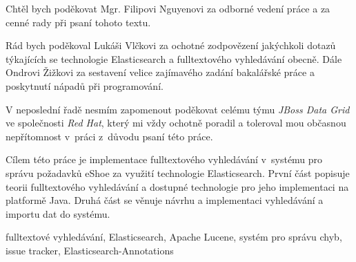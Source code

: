 \documentclass[11pt,oneside]{fithesis2}
\begin{document}
\FrontMatter
\ThesisTitlePage

\begin{ThesisDeclaration}
  \DeclarationText
  \AdvisorName
\end{ThesisDeclaration}

\begin{ThesisThanks}
Chtěl bych poděkovat Mgr. Filipovi Nguyenovi za odborné vedení práce a za cenné rady při psaní tohoto textu. 

Rád bych poděkoval Lukáši Vlčkovi za ochotné zodpovězení jakýchkoli dotazů týkajících se technologie Elasticsearch a fulltextového vyhledávání obecně. Dále Ondrovi Žižkovi za sestavení velice zajímavého zadání bakalářské práce a poskytnutí nápadů při programování.

V neposlední řadě nesmím zapomenout poděkovat celému týmu \emph{JBoss Data Grid} ve společnosti \emph{Red Hat}, který mi vždy ochotně poradil a toleroval mou občasnou nepřítomnost v~práci z~důvodu psaní této práce.
\end{ThesisThanks}

\begin{ThesisAbstract}
Cílem této práce je implementace fulltextového vyhledávání v~systému pro správu požadavků eShoe za využití technologie Elasticsearch. První část popisuje teorii fulltextového vyhledávání a dostupné technologie pro jeho implementaci na platformě Java. Druhá část se věnuje návrhu a implementaci vyhledávání a importu dat do systému.
\end{ThesisAbstract}

\begin{ThesisKeyWords}
fulltextové vyhledávání, Elasticsearch, Apache Lucene, systém pro správu chyb, issue tracker, Elasticsearch-Annotations
\end{ThesisKeyWords}

\MainMatter

\tableofcontents


\end{document}
